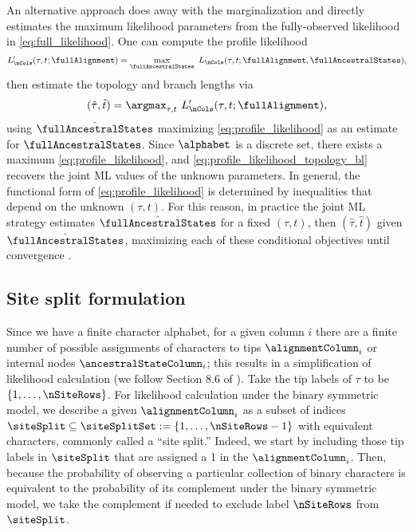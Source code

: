 An alternative approach does away with the marginalization and directly estimates the maximum likelihood parameters from the fully-observed likelihood in \eqref{eq:full_likelihood}.
One can compute the profile likelihood
\begin{equation}
\label{eq:profile_likelihood}
L_\nCols'(\tau, t; \fullAlignment) = \max_{\fullAncestralStates} \ L_\nCols(\tau, t; \fullAlignment, \fullAncestralStates),
\end{equation}
then estimate the topology and branch lengths via
\begin{equation}
\label{eq:profile_likelihood_topology_bl}
(\hat{\tau}, \hat{t}) = \argmax_{\tau, t} \ L_\nCols'(\tau, t; \fullAlignment),
\end{equation}
using $\hat{\fullAncestralStates}$ maximizing \eqref{eq:profile_likelihood} as an estimate for $\fullAncestralStates$.
Since $\alphabet$ is a discrete set, there exists a maximum \eqref{eq:profile_likelihood}, and \eqref{eq:profile_likelihood_topology_bl} recovers the joint ML values of the unknown parameters.
In general, the functional form of \eqref{eq:profile_likelihood} is determined by inequalities that depend on the unknown $(\tau,t)$.
For this reason, in practice the joint ML strategy estimates $\hat{\fullAncestralStates}$ for a fixed $(\tau,t)$, then $(\hat{\tau},\hat{t})$ given $\hat{\fullAncestralStates}$, maximizing each of these conditional objectives until convergence \cite{Sagulenko2017-jo}.


\subsection{Site split formulation}

Since we have a finite character alphabet, for a given column $i$ there are a finite number of possible assignments of characters to tips $\alignmentColumn_i$ or internal nodes $\ancestralStateColumn_i$; this results in a simplification of likelihood calculation (we follow Section 8.6 of \cite{Semple2003-em}).
Take the tip labels of $\tau$ to be $\{1,\ldots,\nSiteRows\}$.
For likelihood calculation under the binary symmetric model, we describe a given $\alignmentColumn_i$ as a subset of indices $\siteSplit\subseteq\siteSplitSet:=\{1,\ldots,\nSiteRows-1\}$ with equivalent characters, commonly called a ``site split.''
Indeed, we start by including those tip labels in $\siteSplit$ that are assigned a 1 in the $\alignmentColumn_i$.
Then, because the probability of observing a particular collection of binary characters is equivalent to the probability of its complement under the binary symmetric model, we take the complement if needed to exclude label $\nSiteRows$ from $\siteSplit$.

